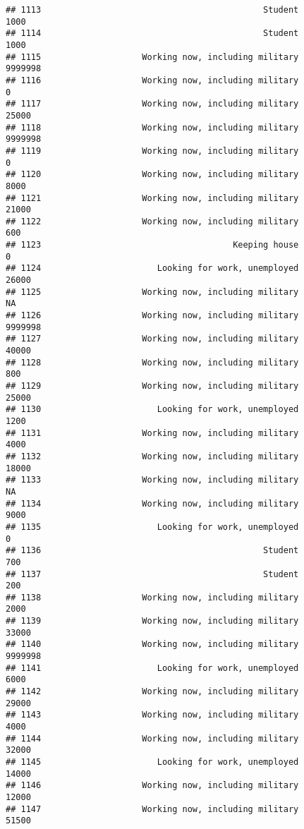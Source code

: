 \documentclass[]{book}
\theoremstyle{definition}
\theoremstyle{definition}
\theoremstyle{remark}
\begin{document}
\begin{verbatim}
## 1113                                            Student            1000
## 1114                                            Student            1000
## 1115                    Working now, including military         9999998
## 1116                    Working now, including military               0
## 1117                    Working now, including military           25000
## 1118                    Working now, including military         9999998
## 1119                    Working now, including military               0
## 1120                    Working now, including military            8000
## 1121                    Working now, including military           21000
## 1122                    Working now, including military             600
## 1123                                      Keeping house               0
## 1124                       Looking for work, unemployed           26000
## 1125                    Working now, including military              NA
## 1126                    Working now, including military         9999998
## 1127                    Working now, including military           40000
## 1128                    Working now, including military             800
## 1129                    Working now, including military           25000
## 1130                       Looking for work, unemployed            1200
## 1131                    Working now, including military            4000
## 1132                    Working now, including military           18000
## 1133                    Working now, including military              NA
## 1134                    Working now, including military            9000
## 1135                       Looking for work, unemployed               0
## 1136                                            Student             700
## 1137                                            Student             200
## 1138                    Working now, including military            2000
## 1139                    Working now, including military           33000
## 1140                    Working now, including military         9999998
## 1141                       Looking for work, unemployed            6000
## 1142                    Working now, including military           29000
## 1143                    Working now, including military            4000
## 1144                    Working now, including military           32000
## 1145                       Looking for work, unemployed           14000
## 1146                    Working now, including military           12000
## 1147                    Working now, including military           51500

\end{verbatim}
\end{document}
